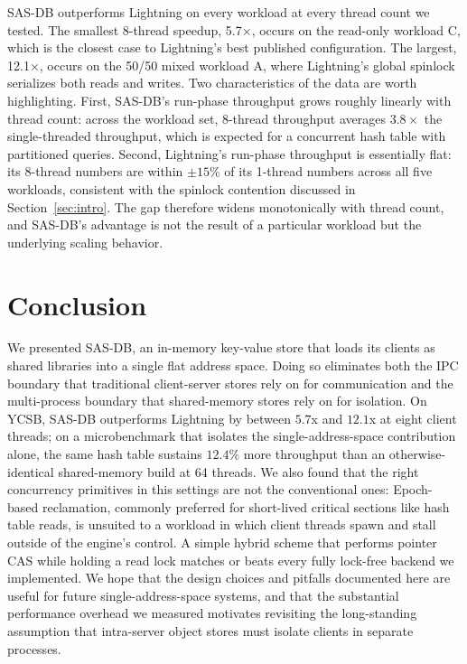 SAS-DB outperforms Lightning on every workload at every thread count we tested.
The smallest 8-thread speedup, 5.7$\times$, occurs on the read-only workload C,
which is the closest case to Lightning's best published configuration. The
largest, 12.1$\times$, occurs on the 50/50 mixed workload A, where Lightning's
global spinlock serializes both reads and writes. Two characteristics of the
data are worth highlighting. First, SAS-DB's run-phase throughput grows roughly
linearly with thread count: across the workload set, 8-thread throughput
averages $3.8\times$ the single-threaded throughput, which is expected for a
concurrent hash table with partitioned queries. Second, Lightning's run-phase
throughput is essentially flat: its 8-thread numbers are within $\pm 15\%$ of
its 1-thread numbers across all five workloads, consistent with the spinlock
contention discussed in Section~\ref{sec:intro}. The gap therefore widens
monotonically with thread count, and SAS-DB's advantage is not the result of a
particular workload but the underlying scaling behavior.

\section{Conclusion}

We presented SAS-DB, an in-memory key-value store that loads its clients as
shared libraries into a single flat address space. Doing so eliminates both the
IPC boundary that traditional client-server stores rely on for communication and
the multi-process boundary that shared-memory stores rely on for isolation. On
YCSB, SAS-DB outperforms Lightning by between $5.7$x and $12.1$x at eight client
threads; on a microbenchmark that isolates the single-address-space
contribution alone, the same hash table sustains $12.4\%$ more throughput than
an otherwise-identical shared-memory build at 64 threads. We also found that the
right concurrency primitives in this settings are not the conventional ones:
Epoch-based reclamation, commonly preferred for short-lived critical sections
like hash table reads, is unsuited to a workload in which client threads spawn
and stall outside of the engine's control. A simple hybrid scheme that performs
pointer CAS while holding a read lock matches or beats every fully lock-free
backend we implemented. We hope that the design choices and pitfalls documented
here are useful for future single-address-space systems, and that the
substantial performance overhead we measured motivates revisiting the
long-standing assumption that intra-server object stores must isolate clients in
separate processes.





